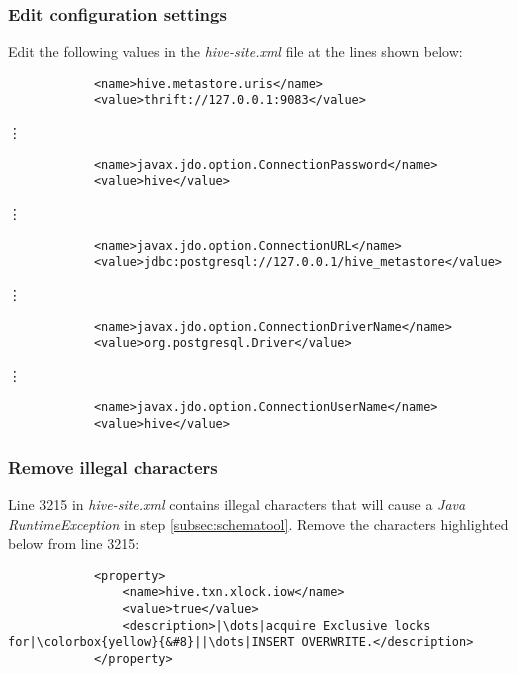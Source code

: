 \documentclass{article}
\begin{document}
        \subsubsection{Edit configuration settings}
        Edit the following values in the \emph{hive-site.xml} file at the lines shown below:
        \begin{verbatim}
            <name>hive.metastore.uris</name>
            <value>thrift://127.0.0.1:9083</value>
        \end{verbatim}
        \centerline{\vdots}
        \begin{verbatim}
            <name>javax.jdo.option.ConnectionPassword</name>
            <value>hive</value>
        \end{verbatim}
        \centerline{\vdots}
        \begin{verbatim}
            <name>javax.jdo.option.ConnectionURL</name>
            <value>jdbc:postgresql://127.0.0.1/hive_metastore</value>
        \end{verbatim}
        \centerline{\vdots}
        \begin{verbatim}
            <name>javax.jdo.option.ConnectionDriverName</name>
            <value>org.postgresql.Driver</value>
        \end{verbatim}
        \centerline{\vdots}
        \begin{verbatim}
            <name>javax.jdo.option.ConnectionUserName</name>
            <value>hive</value>
        \end{verbatim}

        \subsubsection{Remove illegal characters}
        Line 3215 in \emph{hive-site.xml} contains illegal characters that will cause a
        \emph{Java RuntimeException} in step \ref{subsec:schematool}. Remove the characters highlighted below from line 3215:
        \begin{verbatim}
            <property>
                <name>hive.txn.xlock.iow</name>
                <value>true</value>
                <description>|\dots|acquire Exclusive locks for|\colorbox{yellow}{&#8}||\dots|INSERT OVERWRITE.</description>
            </property>
        \end{verbatim}
\end{document}
